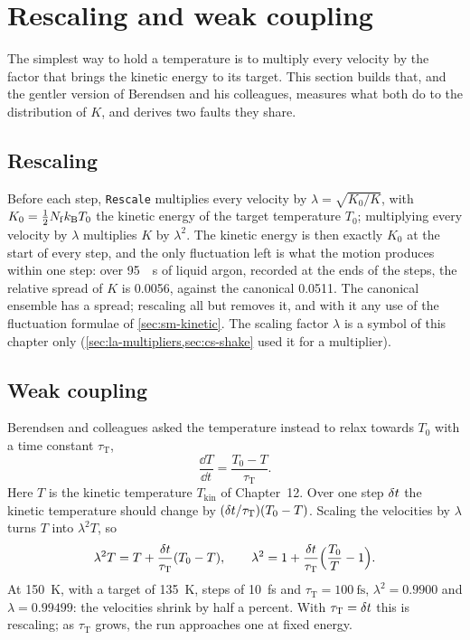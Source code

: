 \section{Rescaling and weak coupling}
\label{sec:th-berendsen}

The simplest way to hold a temperature is to multiply every velocity by
the factor that brings the kinetic energy to its target. This section
builds that, and the gentler version of Berendsen and his colleagues,
measures what both do to the distribution of $K$, and derives two faults
they share.

\subsection*{Rescaling}

Before each step, \texttt{Rescale} multiplies every velocity by
$\lambda = \sqrt{K_0/K}$, with $K_0 = \frac12N_{\mathrm f}k_{\mathrm{B}} T_0$ the
kinetic energy of the target temperature $T_0$; multiplying every
velocity by $\lambda$ multiplies $K$ by $\lambda^2$. The kinetic energy is
then exactly $K_0$ at the start of every step, and the only fluctuation
left is what the motion produces within one step: over \SI{95}{\pico
\second} of liquid argon, recorded at the ends of the steps, the relative
spread of $K$ is 0.0056, against the canonical 0.0511. The canonical
ensemble has a spread; rescaling all but removes it, and with it any use
of the fluctuation formulae of \cref{sec:sm-kinetic}. The scaling factor $\lambda$ is a
symbol of this chapter only (\cref{sec:la-multipliers,sec:cs-shake} used
it for a multiplier).

\subsection*{Weak coupling}

Berendsen and colleagues asked the temperature instead to relax towards
$T_0$ with a time constant $\tau_{\mathrm T}$\cite{Berendsen1984},
\begin{equation*}
   \frac{\dd T}{\dd t} = \frac{T_0 - T}{\tau_{\mathrm T}} .
\end{equation*}
Here $T$ is the kinetic temperature $T_{\mathrm{kin}}$ of Chapter~12.
Over one step $\delta t$ the kinetic temperature should change by $(\delta t/
\tau_{\mathrm T})(T_0 - T)$. Scaling the velocities by $\lambda$ turns $T$
into $\lambda^2T$, so
\begin{equation}
   \lambda^2T = T + \frac{\delta t}{\tau_{\mathrm T}}(T_0 - T) , \qquad
   \lambda^2 = 1 + \frac{\delta t}{\tau_{\mathrm T}}\Bigl(\frac{T_0}{T} - 1
   \Bigr) .
   \label{eq:th-berendsen}
\end{equation}
At \SI{150}{\kelvin}, with a target of \SI{135}{\kelvin}, steps of
\SI{10}{\femto\second} and $\tau_{\mathrm T} = \SI{100}{\femto\second}$,
$\lambda^2 = 0.9900$ and $\lambda = 0.99499$: the velocities shrink by half
a percent. With $\tau_{\mathrm T} = \delta t$ this is rescaling; as
$\tau_{\mathrm T}$ grows, the run approaches one at fixed energy.

